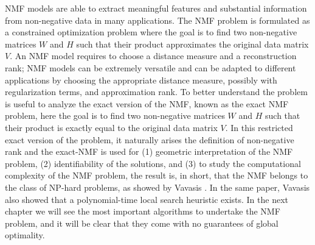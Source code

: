 NMF models are able to extract meaningful features and substantial information from non-negative data in many applications. 
The NMF problem is formulated as a constrained optimization problem where the goal is to find two non-negative matrices $W$ and $H$ such that their product approximates the original data matrix $V.$
An NMF model requires to choose a distance measure and a reconstruction rank; NMF models can be extremely versatile and can be adapted to different applications by choosing the appropriate distance measure, possibly with regularization terms, and approximation rank.
To better understand the problem is useful to analyze the exact version of the NMF, known as the exact NMF problem, here the goal is to find two non-negative matrices $W$ and $H$ such that their product is exactly equal to the original data matrix $V$.
In this restricted exact version of the problem, it naturally arises the definition of non-negative rank and the exact-NMF is used for (1) geometric interpretation of the NMF problem, (2) identifiability of the solutions, and (3) to study the computational complexity of the NMF problem, the result is, in short, that the NMF belongs to the class of NP-hard problems, as showed by Vavasis \cite{vavasis2007complexitynonnegativematrixfactorization}. 
In the same paper, Vavasis also showed that a polynomial-time local search heuristic exists. In the next chapter we will see the most important algorithms to undertake the NMF problem, and it will be clear that they come with no guarantees of global optimality.
